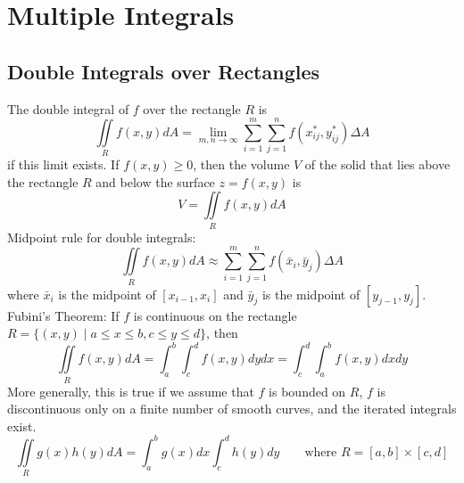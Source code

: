 \documentclass{article}
\title{} %
\author{John Yang}
\begin{document}
    \maketitle
    \tableofcontents
    \section{Multiple Integrals} %
    \subsection{Double Integrals over Rectangles} %
    \begin{outline}
        \1 The double integral of $f$ over the rectangle $R$ is \[\iint\limits_Rf(x,y)dA=\lim_{m,n\to\infty}\sum^m_{i=1}\sum^n_{j=1}f(x_{ij}^*,y_{ij}^*)\Delta A\] if this limit exists. 
        \1 If \(f(x,y)\geq 0\), then the volume $V$ of the solid that lies above the rectangle $R$ and below the surface \(z=f(x,y)\) is \[V=\iint\limits_Rf(x,y)dA\]
        \1 Midpoint rule for double integrals: \[\iint\limits_Rf(x,y)dA\approx\sum^m_{i=1}\sum^n_{j=1}f(\bar x_i,\bar y_j)\Delta A\] where \(\bar x_i\) is the midpoint of \([x_{i-1},x_i]\) and \(\bar y_j\) is the midpoint of \([y_{j-1},y_j]\). 
        \1 Fubini's Theorem: If $f$ is continuous on the rectangle \(R=\{(x,y)\;|\;a\leq x\leq b,c\leq y\leq d\}\), then \[\iint\limits_Rf(x,y)dA=\int^b_a\int^d_cf(x,y)dydx=\int^d_c\int^b_af(x,y)dxdy\] More generally, this is true if we assume that $f$ is bounded on $R$, $f$ is discontinuous only on a finite number of smooth curves, and the iterated integrals exist. 
        \1 \[\iint\limits_Rg(x)h(y)dA=\int^b_ag(x)dx\int^d_ch(y)dy\qquad\text{where }R=[a,b]\times[c,d]\]

    \end{outline}
\end{document}
